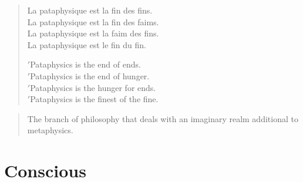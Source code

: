 \begin{quotation}
  \begin{multicols}{2}
  La pataphysique est la fin des fins.\\
  La pataphysique est la fin des faims.\\
  La pataphysique est la faim des fins.\\
  La pataphysique est le fin du fin.
  \par \vfill \columnbreak{}
  \begin{flushright}
  $'$Pataphysics is the end of ends.\\
  $'$Pataphysics is the end of hunger.\\
  $'$Pataphysics is the hunger for ends.\\
  $'$Pataphysics is the finest of the fine.
  \end{flushright}
  \end{multicols}
\end{quotation}

\begin{quotation}
  The branch of philosophy that deals with an imaginary realm additional to metaphysics. 
\end{quotation}




\section{Conscious}


